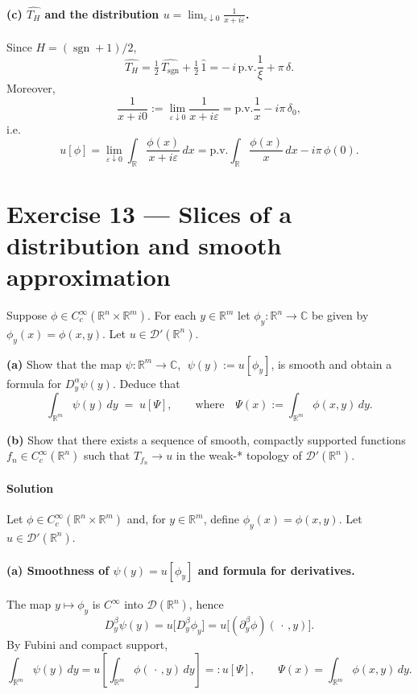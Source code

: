 \documentclass[12pt,a4paper]{article}
\theoremstyle{plain}
\theoremstyle{definition}
\theoremstyle{remark}
\theoremstyle{remark}
\begin{document}
\smallskip

\paragraph{(c) $\widehat{T_H}$ and the distribution $u=\lim_{\varepsilon\downarrow0}\frac{1}{x+i\varepsilon}$.}
Since $H=(\operatorname{sgn}+1)/2$,
\[
\widehat{T_H}
=\tfrac12\,\widehat{T_{\operatorname{sgn}}}+\tfrac12\,\widehat{1}
= -\,i\,\mathrm{p.v.}\!\frac{1}{\xi} + \pi\,\delta.
\]
Moreover,
\[
\frac{1}{x+i0}:=\lim_{\varepsilon\downarrow0}\frac{1}{x+i\varepsilon}
= \mathrm{p.v.}\!\frac{1}{x} - i\pi\,\delta_0,
\]
i.e.
\[
u[\phi]=\lim_{\varepsilon\downarrow0}\int_{\mathbb R}\frac{\phi(x)}{x+i\varepsilon}\,dx
= \mathrm{p.v.}\!\int_{\mathbb R}\frac{\phi(x)}{x}\,dx - i\pi\,\phi(0).
\]

\bigskip
\bigskip

\section*{Exercise 13 — Slices of a distribution and smooth approximation}

Suppose $\phi\in C_c^\infty(\mathbb R^n\times\mathbb R^m)$. For each $y\in\mathbb R^m$ let
$\phi_y:\mathbb R^n\to\mathbb C$ be given by $\phi_y(x)=\phi(x,y)$. Let $u\in\mathcal D'(\mathbb R^n)$.

\smallskip
\noindent
\textbf{(a)} Show that the map $\psi:\mathbb R^m\to\mathbb C$, $\;\psi(y):=u[\phi_y]$, is smooth and obtain a formula for
$D_y^\alpha\psi(y)$. Deduce that
\[
\int_{\mathbb R^m}\psi(y)\,dy \;=\; u[\Psi], \qquad
\text{where}\quad \Psi(x):=\int_{\mathbb R^m}\phi(x,y)\,dy.
\]

\smallskip
\noindent
\textbf{(b)} Show that there exists a sequence of smooth, compactly supported functions
$f_n\in C_c^\infty(\mathbb R^n)$ such that $T_{f_n}\to u$ in the weak-* topology of $\mathcal D'(\mathbb R^n)$.

\paragraph*{Solution}

Let $\phi\in C_c^\infty(\mathbb R^n\times\mathbb R^m)$ and, for $y\in\mathbb R^m$, define $\phi_y(x)=\phi(x,y)$.
Let $u\in\mathcal D'(\mathbb R^n)$.

\paragraph{(a) Smoothness of $\psi(y)=u[\phi_y]$ and formula for derivatives.}
The map $y\mapsto\phi_y$ is $C^\infty$ into $\mathcal D(\mathbb R^n)$, hence
\[
D_y^\beta\psi(y)=u\!\big[D_y^\beta\phi_y\big]
= u\!\big[(\partial_y^\beta\phi)(\,\cdot\,,y)\big].
\]
By Fubini and compact support,
\[
\int_{\mathbb R^m}\psi(y)\,dy
= u\!\left[\int_{\mathbb R^m}\phi(\,\cdot\,,y)\,dy\right]
=: u[\Psi],\qquad \Psi(x)=\int_{\mathbb R^m}\phi(x,y)\,dy.
\]
\end{document}
